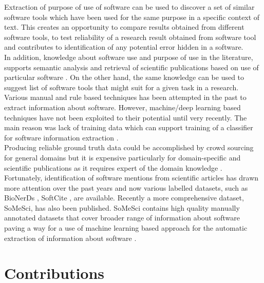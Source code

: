 Extraction of purpose of use of  software can be used to discover a set of similar software tools which have been used for the same purpose in a specific context of text. This creates an opportunity to compare results obtained from different software tools, to test reliability of a research result obtained from software tool and contributes to identification of any potential error hidden in a software.  \\

In addition, knowledge about software use and purpose of use in the literature, supports semantic analysis and retrieval of scientific publications based on use of particular software \citep{schindler2019annotation}. On the other hand, the same knowledge can be used to suggest list of software tools that might suit for a given task in a research. \\


Various manual and rule based techniques has been attempted in the past to extract information about software. However, machine/deep learning based techniques have not been exploited to their potential until very recently. The main reason was lack of training data which can support training of a classifier for software information extraction \citep{schindler2021somesci}. \\

Producing reliable ground truth data could be accomplished by crowd sourcing for general domains but it is expensive particularly for domain-specific and scientific publications as it requires expert of the domain knowledge \citep{beltagy2019scibert}.\\


Fortunately, identification of software mentions from scientific articles has drawn more attention over the past years and now various labelled datasets, such as BioNerDs \citep{duck2013bionerds} , SoftCite \citep{du2021softcite}, are available. Recently a more comprehensive dataset, SoMeSci, has also been published.  SoMeSci contains high quality manually annotated datasets that cover broader range of information about software paving a way for a use of machine learning based approach for the automatic extraction of information about software \citep{schindler2021somesci}. 


\section{Contributions }
\label{sec:intro:Contributions}

